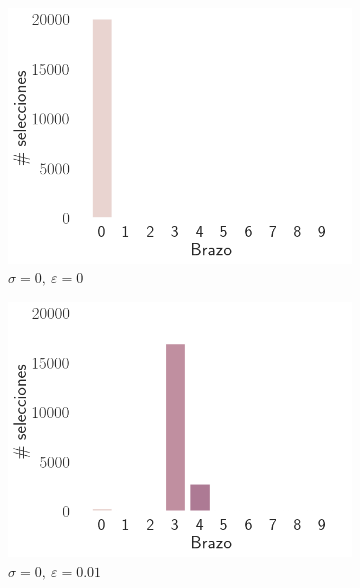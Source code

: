 \documentclass[12pt]{article}
\begin{document}
    \begin{figure}[H]
        \centering
        \begin{subfigure}[H]{0.3\textwidth}
            \includegraphics[width=\textwidth]{../img/arm_sigma_0_epsilon_0}
            \caption{$\sigma=0 ,\ \varepsilon=0$}
            \label{fig:arms_selected_0_0}
        \end{subfigure}
        \begin{subfigure}[H]{0.3\textwidth}
            \includegraphics[width=\textwidth]{../img/arm_sigma_0_epsilon_0.01}
            \caption{$\sigma=0 ,\ \varepsilon=0.01$}
            \label{fig:arms_selected_0_0.01}
        \end{subfigure}
        \begin{subfigure}[H]{0.3\textwidth}

\end{subfigure}
\end{figure}
\end{document}
